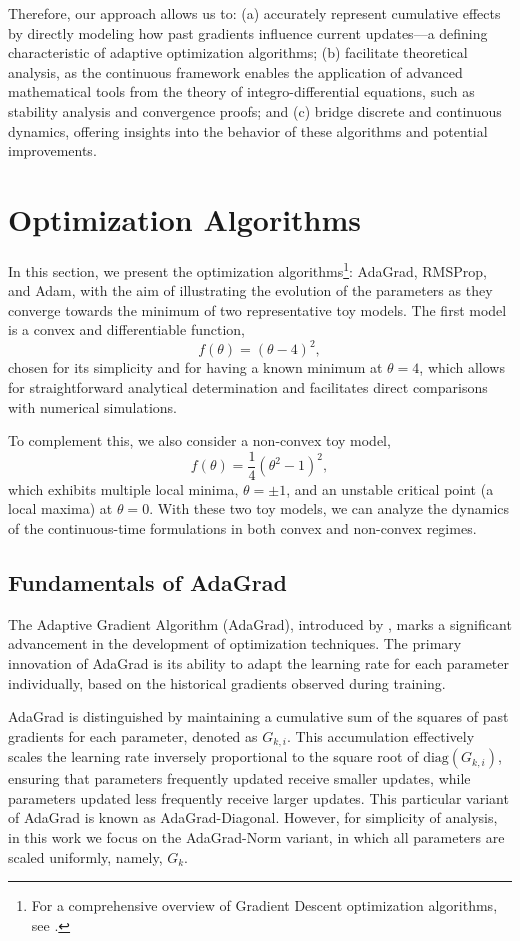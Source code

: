 \documentclass{article} %
\begin{document}
Therefore, our approach allows us to: (a) accurately represent cumulative effects by directly modeling how past gradients influence current updates—a defining characteristic of adaptive optimization algorithms; (b) facilitate theoretical analysis, as the continuous framework enables the application of advanced mathematical tools from the theory of integro-differential equations, such as stability analysis and convergence proofs; and (c) bridge discrete and continuous dynamics, offering insights into the behavior of these algorithms and potential improvements.


\section{Optimization Algorithms}\label{sec:OPC}
In this section, we present the optimization algorithms\footnote{For a comprehensive overview of Gradient Descent optimization algorithms, see \cite{ruder2016overview}.}: AdaGrad, RMSProp, and Adam, with the aim of illustrating the evolution of the parameters as they converge towards the minimum of two representative toy models. The first model is a convex and differentiable function,  
\[
f(\theta) = (\theta - 4)^2,
\]
chosen for its simplicity and for having a known minimum at \( \theta = 4 \), which allows for straightforward analytical determination and facilitates direct comparisons with numerical simulations.  

To complement this, we also consider a non-convex toy model,  
\[
f(\theta) = \frac{1}{4}(\theta^2 - 1)^2,
\]
which exhibits multiple local minima, $\theta=\pm 1$, and an unstable critical point (a local maxima) at $\theta=0$. With these two toy models, we can analyze the dynamics of the continuous-time formulations in both convex and non-convex regimes.

\subsection{Fundamentals of AdaGrad}
The Adaptive Gradient Algorithm (AdaGrad), introduced by \cite{AdaGra}, marks a significant advancement in the development of optimization techniques. The primary innovation of AdaGrad is its ability to adapt the learning rate for each parameter individually, based on the historical gradients observed during training. 

AdaGrad is distinguished by maintaining a cumulative sum of the squares of past gradients for each parameter, denoted as \( G_{k,i} \). This accumulation effectively scales the learning rate inversely proportional to the square root of \( \text{diag}(G_{k,i} )\), ensuring that parameters frequently updated receive smaller updates, while parameters updated less frequently receive larger updates. This particular variant of AdaGrad is known as AdaGrad-Diagonal. However, for simplicity of analysis, in this work we focus on the AdaGrad-Norm variant, in which all parameters are scaled uniformly, namely, $G_k$. 
\end{document}
